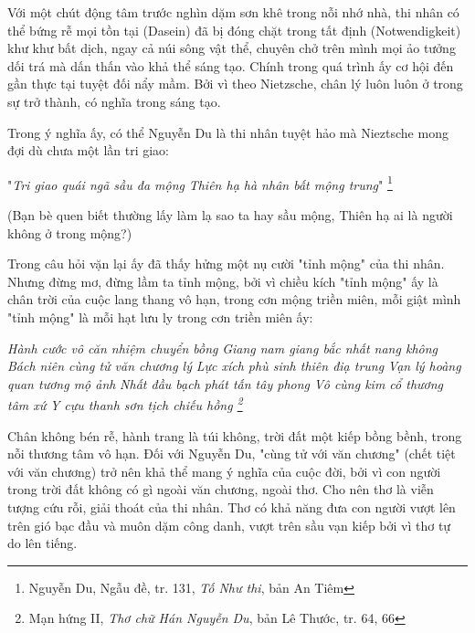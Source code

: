 \documentclass[../main.tex]{subfiles}
\begin{document}
\begin{multicols}{2}
Với một chút động tâm trước nghìn dặm sơn khê trong nỗi nhớ nhà, thi nhân có thể bứng rễ mọi tồn tại (Dasein) đã bị đóng chặt trong tất định (Notwendigkeit) khư khư bất dịch, ngay cả núi sông vật thể, chuyên chở trên mình mọi ảo tưởng dối trá mà dấn thấn vào khả thể sáng tạo. Chính trong quá trình ấy cơ hội đến gần thực tại tuyệt đối nẩy mầm. Bởi vì theo Nietzsche, chân lý luôn luôn ở trong sự trở thành, có nghĩa trong sáng tạo.  
 
Trong ý nghĩa ấy, có thể Nguyễn Du là thi nhân tuyệt hảo mà Nieztsche mong đợi dù chưa một lần tri giao: 
\begin{blockquote}
        
"\textit{Tri giao quái ngã sầu đa mộng}        
\textit{Thiên hạ hà nhân bất mộng trung}" \footnote{
Nguyễn Du, Ngẫu đề, tr. 131, \textit{Tố Như thi}, bản An Tiêm}  
        
(Bạn bè quen biết thường lấy làm lạ sao ta hay sầu mộng,        
Thiên hạ ai là người không ở trong mộng?) 

\end{blockquote}
 
Trong câu hỏi vặn lại ấy đã thấy hửng một nụ cười "tỉnh mộng" của thi nhân. Nhưng đừng mơ, đừng lầm ta tỉnh mộng, bởi vì chiều kích "tỉnh mộng" ấy  là chân trời của cuộc lang thang vô hạn, trong cơn mộng triền miên, mỗi giật mình "tỉnh mộng" là mỗi hạt lưu ly trong cơn triền miên ấy:  
\begin{blockquote}
        
\textit{Hành cước vô căn nhiệm chuyển bồng}        
\textit{Giang nam giang bắc nhất nang không}        
\textit{Bách niên cùng tử văn chương lý}        
\textit{Lực xích phù sinh thiên điạ trung}        
\textit{Vạn lý hoàng quan tương mộ ảnh}        
\textit{Nhất đầu bạch phát tấn tây phong}        
\textit{Vô cùng kim cổ thương tâm xứ}        
\textit{Y cựu thanh sơn tịch chiếu hồng \footnote{
Mạn hứng II, \textit{Thơ chữ Hán Nguyễn Du}, bản Lê Thước, tr.  64, 66} } 

\end{blockquote}
 
Chân không bén rễ, hành trang là túi không, trời đất một kiếp bồng bềnh, trong nỗi thương tâm vô hạn. Đối với Nguyễn Du, "cùng tử với văn chương" (chết tiệt với văn chương) trở nên khả thể mang ý nghĩa của cuộc đời, bởi vì con người trong trời đất không có gì ngoài văn chương, ngoài thơ. Cho nên thơ là viễn tượng cứu rỗi, giải thoát của thi nhân. Thơ có khả năng đưa con người vượt lên trên gió bạc đầu và muôn dặm công danh, vượt trên sầu vạn kiếp bởi vì thơ tự do lên tiếng. 
 

\end{multicols}
\end{document}
